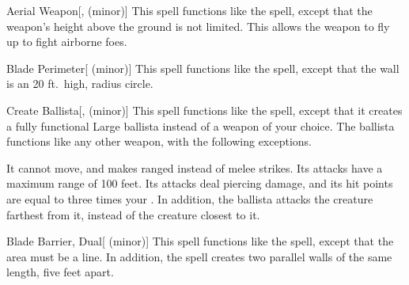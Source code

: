 \lowercase{\hypertarget{spell:Aerial Weapon}{}}\label{spell:Aerial Weapon}
\begin{apability}[\nth{2}]{\hypertarget{spell:Aerial Weapon}{Aerial Weapon}}[,  (minor)]
This spell functions like the  spell, except that the weapon's height above the ground is not limited.
This allows the weapon to fly up to fight airborne foes.
\end{apability}
\vspace{0.25em}



\lowercase{\hypertarget{spell:Blade Perimeter}{}}\label{spell:Blade Perimeter}
\begin{apability}[\nth{2}]{\hypertarget{spell:Blade Perimeter}{Blade Perimeter}}[ (minor)]
This spell functions like the  spell, except that the wall is an 20 ft.\ high, \areamed radius circle.
\end{apability}
\vspace{0.25em}



\lowercase{\hypertarget{spell:Create Ballista}{}}\label{spell:Create Ballista}
\begin{apability}[\nth{2}]{\hypertarget{spell:Create Ballista}{Create Ballista}}[,  (minor)]
This spell functions like the  spell, except that it creates a fully functional Large ballista instead of a weapon of your choice.
The ballista functions like any other weapon, with the following exceptions.

It cannot move, and makes ranged  instead of melee strikes.
Its attacks have a maximum range of 100 feet.
Its attacks deal piercing damage, and its hit points are equal to three times your .
In addition, the ballista attacks the creature farthest from it, instead of the creature closest to it.
\end{apability}
\vspace{0.25em}



\lowercase{\hypertarget{spell:Blade Barrier, Dual}{}}\label{spell:Blade Barrier, Dual}
\begin{apability}[\nth{3}]{\hypertarget{spell:Blade Barrier, Dual}{Blade Barrier, Dual}}[ (minor)]
This spell functions like the  spell, except that the area must be a line.
In addition, the spell creates two parallel walls of the same length, five feet apart.
\end{apability}
\vspace{0.25em}



